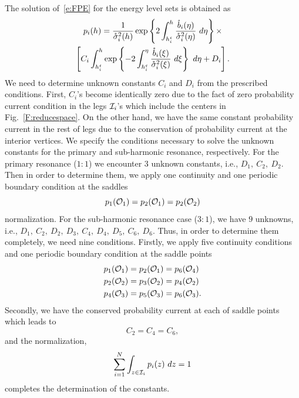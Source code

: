 The solution of~\eqref{e:FPE} for the energy level sets is obtained as
\begin{multline*}
p_i(h) = \frac{1}{{\mathring{\sigma}}^2_i(h)}\exp
\left\{2\int^h_{h_i^\mathfrak c} \frac{\mathring{b}_i(\eta)}{{\mathring{\sigma}}^2_i(\eta)}\ d\eta \right\} \times\\
\left[ C_i \int^h_{h_i^\mathfrak c} \exp \left\{-2
\int^\eta_{h_i^\mathfrak c}\frac{\mathring{b}_i(\xi)}{{\mathring{\sigma}}^2_i(\xi)}\
d\xi \right\}\ d\eta +D_i \right] .
\end{multline*}
We need to determine unknown constants $C_i$ and $D_i$ from the prescribed conditions. First, $C_i$'s become identically zero due to the fact of zero probability current condition in the legs $\mathcal I_i$'s which include the centers in Fig.~\ref{F:reducespace}. On the other hand, we have the same constant probability current in the rest of legs due to the conservation of probability current at the interior vertices. We specify the conditions necessary to solve the unknown constants for the primary and sub-harmonic resonance, respectively. For the primary resonance ($1:1$) we encounter $3$ unknown constants, i.e., $D_1,\ C_2,\ D_2$. Then in order to determine them, we apply one continuity and one periodic boundary condition at the saddles
\[
p_1(\mathcal O_1)=p_2(\mathcal O_1)=p_2(\mathcal O_2)
\]
normalization. For the sub-harmonic resonance case ($3:1$), we have
$9$ unknowns, i.e., $D_1,\ C_2,\ D_2,\ D_3,\ C_4,\ D_4,\ D_5,\
C_6,\ D_6$. Thus, in order to determine them completely, we need
nine conditions. Firstly, we apply five continuity conditions and
one periodic boundary condition at the saddle points
\begin{align*}
p_1(\mathcal O_1) &= p_2(\mathcal O_1)=p_6(\mathcal O_4)\\
p_2(\mathcal O_2) &= p_3(\mathcal O_2)=p_4(\mathcal O_2)\\
p_4(\mathcal O_3) &= p_5(\mathcal O_3)=p_6(\mathcal O_3).
\end{align*}
Secondly, we have the conserved probability current at each of saddle points which leads to
\[
C_2 = C_4 = C_6,
\]
and the normalization,
\[
\sum_{i=1}^N \int_{z\in \mathcal I_i} p_i(z)\ dz = 1
\]
completes the determination of the constants.

